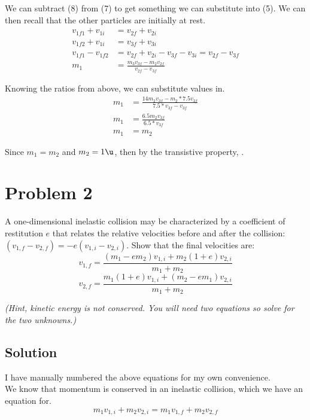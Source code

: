 \documentclass[12pt]{article}
\begin{document}
\setcounter{equation}{6}
We can subtract (8) from (7) to get something we can substitute into (5). We can then recall that the other particles are initially at rest.
\begin{align}
    v_{1f1} + v_{1i} &= v_{2f} + v_{2i}\\
    v_{1f2} + v_{1i} &= v_{3f} + v_{3i}\\
    v_{1f1} - v_{1f2} &= v_{2f} + v_{2i} - v_{3f} - v_{3i} = v_{2f} - v_{3f}\\
    m_1 &=  \frac{m_3v_{3f} - m_2v_{2f}}{v_{2f} - v_{3f}}
\end{align}

Knowing the ratios from above, we can substitute values in.
\begin{align}
    m_1 &=  \frac{14m_2v_{3f} - m_2*7.5v_{3f}}{7.5*v_{3f} - v_{3f}}\\
    m_1 &=  \frac{6.5m_2v_{3f}}{6.5*v_{3f}}\\
    m_1 &=  m_2
\end{align}

Since $m_1 = m_2$ and $m_2 = 1\unit{\u}$, then by the transistive property, .


\pagebreak
\section*{Problem 2}
\setcounter{equation}{0}
A one-dimensional inelastic collision may be characterized by a coefficient of restitution $e$ that relates the relative velocities before and after the collision: $(v_{1,f} - v_{2,f}) = -e(v_{1,i} - v_{2,i})$. Show that the final velocities are:
\begin{equation}
    v_{1,f} = \frac{(m_1 - em_2)v_{1,i} + m_2(1 + e)v_{2,i}}{m_1 + m_2}
\end{equation}
\begin{equation}
    v_{2,f} = \frac{m_1(1 + e)v_{1,i} + (m_2 - em_1)v_{2,i}}{m_1 + m_2}
\end{equation}

\textit{(Hint, kinetic energy is not conserved. You will need two equations so solve for the two unknowns.)}
\subsection*{Solution}
I have manually numbered the above equations for my own convenience.\\
We know that momentum is conserved in an inelastic collision, which we have an equation for.
\begin{equation}
    m_1v_{1,i} + m_2v_{2,i} = m_1v_{1,f} + m_2v_{2,f} 
\end{equation}
\end{document}
